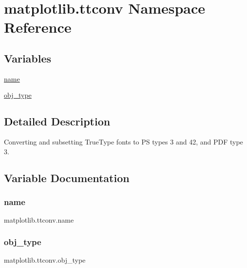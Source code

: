 \hypertarget{namespacematplotlib_1_1ttconv}{}\section{matplotlib.\+ttconv Namespace Reference}
\label{namespacematplotlib_1_1ttconv}
\subsection*{Variables}
\begin{DoxyCompactItemize}
\item 
\hyperlink{namespacematplotlib_1_1ttconv_ae0221f393a82b66892a431faf7d14182}{name}
\item 
\hyperlink{namespacematplotlib_1_1ttconv_adf59806ec220ed6360d8dfa722c4a90b}{obj\+\_\+type}
\end{DoxyCompactItemize}


\subsection{Detailed Description}
\begin{DoxyVerb}Converting and subsetting TrueType fonts to PS types 3 and 42, and PDF type 3.
\end{DoxyVerb}
 

\subsection{Variable Documentation}
\mbox{\label{namespacematplotlib_1_1ttconv_ae0221f393a82b66892a431faf7d14182}} 
\subsubsection{\texorpdfstring{name}{name}}
{\footnotesize\ttfamily matplotlib.\+ttconv.\+name}

\mbox{\label{namespacematplotlib_1_1ttconv_adf59806ec220ed6360d8dfa722c4a90b}} 
\subsubsection{\texorpdfstring{obj\+\_\+type}{obj\_type}}
{\footnotesize\ttfamily matplotlib.\+ttconv.\+obj\+\_\+type}

